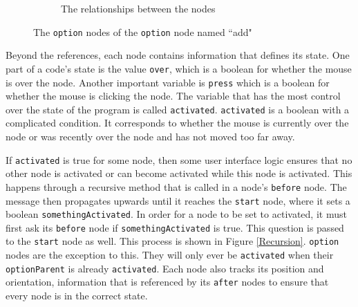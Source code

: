 \documentclass[12pt,twoside]{reedthesis}
\newcommand{\code}[1]{\texttt{#1}}
\begin{document}
\begin{figure}[h]
\begin{subfigure}{0.5\textwidth}
		
		
		
		
		\caption{The relationships between the nodes}
		\label {HowItWorks5B}
	\end{subfigure}
	\caption{The \code{option} nodes of the \code{option} node named ``add"}
	\label{options}
	\end{figure}
	
	
	
	Beyond the references, each node contains information that defines its state. One part of a code's state is the value \code{over}, which is a boolean for whether the mouse is over the node. Another important variable is \code{press} which is a boolean for whether the mouse is clicking the node. The variable that has the most control over the state of the program is called \code{activated}. \code{activated} is a boolean with a complicated condition. It corresponds to whether the mouse is currently over the node or was recently over the node and has not moved too far away. 
	
	If \code{activated} is true for some node, then some user interface logic ensures that no other node is activated or can become activated while this node is activated. This happens through a recursive method that is called in a node's \code{before} node. The message then propagates upwards until it reaches the \code{start} node, where it sets a boolean \code{somethingActivated}. In order for a node to be set to activated, it must first ask its \code{before} node if \code{somethingActivated} is true. This question is passed to the \code{start} node as well. This process is shown in Figure \ref{Recursion}. \code{option} nodes are the exception to this. They will only ever be \code{activated} when their \code{optionParent} is already \code{activated}. Each node also tracks its position and orientation, information that is referenced by its \code{after} nodes to ensure that every node is in the correct state.
	
\end{document}
